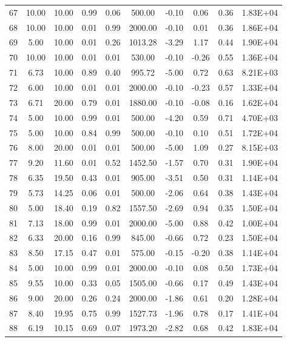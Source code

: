 \begin{landscape}
\begin{center}
\begin{longtable}{|c|c|c|c|c|c|c|c|c|c|}
67 & 10.00 & 10.00 & 0.99 & 0.06 & 500.00  & -0.10 & 0.06  & 0.36 & 1.83E+04 \\
68 & 10.00 & 10.00 & 0.01 & 0.99 & 2000.00 & -0.10 & 0.01  & 0.36 & 1.86E+04 \\
69 & 5.00  & 10.00 & 0.01 & 0.26 & 1013.28 & -3.29 & 1.17  & 0.44 & 1.90E+04 \\
70 & 10.00 & 10.00 & 0.01 & 0.01 & 530.00  & -0.10 & -0.26 & 0.55 & 1.36E+04 \\
71 & 6.73  & 10.00 & 0.89 & 0.40 & 995.72  & -5.00 & 0.72  & 0.63 & 8.21E+03 \\
72 & 6.00  & 10.00 & 0.01 & 0.01 & 2000.00 & -0.10 & -0.23 & 0.57 & 1.33E+04 \\
73 & 6.71  & 20.00 & 0.79 & 0.01 & 1880.00 & -0.10 & -0.08 & 0.16 & 1.62E+04 \\
74 & 5.00  & 10.00 & 0.99 & 0.01 & 500.00  & -4.20 & 0.59  & 0.71 & 4.70E+03 \\
75 & 5.00  & 10.00 & 0.84 & 0.99 & 500.00  & -0.10 & 0.10  & 0.51 & 1.72E+04 \\
76 & 8.00  & 20.00 & 0.01 & 0.01 & 500.00  & -5.00 & 1.09  & 0.27 & 8.15E+03 \\
77 & 9.20  & 11.60 & 0.01 & 0.52 & 1452.50 & -1.57 & 0.70  & 0.31 & 1.90E+04 \\
78 & 6.35  & 19.50 & 0.43 & 0.01 & 905.00  & -3.51 & 0.50  & 0.31 & 1.14E+04 \\
79 & 5.73  & 14.25 & 0.06 & 0.01 & 500.00  & -2.06 & 0.64  & 0.38 & 1.43E+04 \\
80 & 5.00  & 18.40 & 0.19 & 0.82 & 1557.50 & -2.69 & 0.94  & 0.35 & 1.50E+04 \\
81 & 7.13  & 18.00 & 0.99 & 0.01 & 2000.00 & -5.00 & 0.88  & 0.42 & 1.00E+04 \\
82 & 6.33  & 20.00 & 0.16 & 0.99 & 845.00  & -0.66 & 0.72  & 0.23 & 1.50E+04 \\
83 & 8.50  & 17.15 & 0.47 & 0.01 & 575.00  & -0.15 & -0.20 & 0.38 & 1.14E+04 \\
84 & 5.00  & 10.00 & 0.99 & 0.01 & 2000.00 & -0.10 & 0.08  & 0.50 & 1.73E+04 \\
85 & 9.55  & 10.00 & 0.33 & 0.05 & 1505.00 & -0.66 & 0.17  & 0.49 & 1.43E+04 \\
86 & 9.00  & 20.00 & 0.26 & 0.24 & 2000.00 & -1.86 & 0.61  & 0.20 & 1.28E+04 \\
87 & 8.40  & 19.95 & 0.75 & 0.99 & 1527.73 & -1.96 & 0.78  & 0.17 & 1.41E+04 \\
88 & 6.19  & 10.15 & 0.69 & 0.07 & 1973.20 & -2.82 & 0.68  & 0.42 & 1.83E+04 \\

\end{longtable}
\end{center}
\end{landscape}
